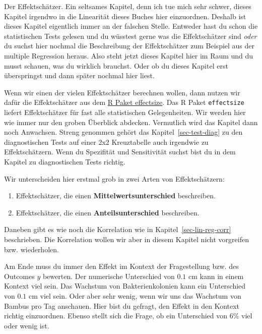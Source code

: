 \documentclass[
  letterpaper,
]{scrbook}
\providecommand{\tightlist}{%
  \setlength{\itemsep}{0pt}\setlength{\parskip}{0pt}}\usepackage{longtable,booktabs,array}
\begin{document}
Der Effektschätzer. Ein seltsames Kapitel, denn ich tue mich sehr
schwer, dieses Kapitel irgendwo in die Linearität dieses Buches hier
einzuordnen. Deshalb ist dieses Kapitel eigentlich immer an der falschen
Stelle. Entweder hast du schon die statistischen Tests gelesen und du
wüsstest gerne was die Effektschätzer sind \emph{oder} du suchst hier
nochmal die Beschreibung der Effektschätzer zum Beispiel aus der
multiple Regression heraus. Also steht jetzt dieses Kapitel hier im Raum
und du musst schauen, was du wirklich brauchst. Oder ob du dieses
Kapitel erst überspringst und dann später nochmal hier liest.

{}

Wenn wir einen der vielen Effektschätzer berechnen wollen, dann nutzen
wir dafür die Effektschätzer aus dem
\href{https://easystats.github.io/effectsize/index.html}{R Paket
effectsize}. Das R Paket \texttt{effectsize} liefert Effektschätzer für
fast alle statistischen Gelegenheiten. Wir werden hier wie immer nur den
groben Überblick abdecken. Vermutlich wird das Kapitel dann noch
Anwachsen. Streng genommen gehört das Kapitel~\ref{sec-test-diag} zu den
diagnostischen Tests auf einer 2x2 Kreuztabelle auch irgendwie zu
Effektschätzern. Wenn du Spezifität und Sensitivität suchst bist du in
dem Kapitel zu diagnostischen Tests richtig.

Wir unterscheiden hier erstmal grob in zwei Arten von Effektschätzern:

\begin{enumerate}
\def\labelenumi{\arabic{enumi})}
\tightlist
\item
  Effektschätzer, die einen \textbf{Mittelwertsunterschied} beschreiben.
\item
  Effektschätzer, die einen \textbf{Anteilsunterschied} beschreiben.
\end{enumerate}

Daneben gibt es wie noch die Korrelation wie in
Kapitel~\ref{sec-lin-reg-corr} beschrieben. Die Korrelation wollen wir
aber in diesem Kapitel nicht vorgreifen bzw. wiederholen.

Am Ende muss du immer den Effekt im Kontext der Fragestellung bzw. des
Outcomes \(y\) bewerten. Der numerische Unterschied von \(0.1\) cm kann
in einem Kontext viel sein. Das Wachstum von Bakterienkolonien kann ein
Unterschied von \(0.1\) cm viel sein. Oder aber sehr wenig, wenn wir uns
das Wachstum von Bambus pro Tag anschauen. Hier bist du gefragt, den
Effekt in den Kontext richtig einzuordnen. Ebenso stellt sich die Frage,
ob ein Unterschied von 6\% viel oder wenig ist.
\end{document}
